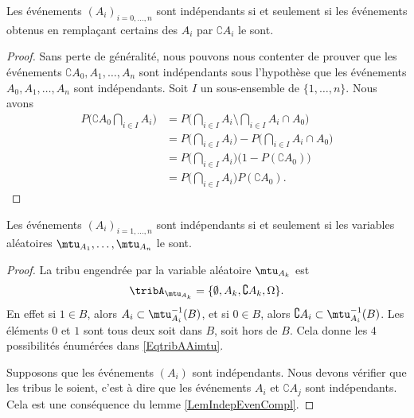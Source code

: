 \begin{lemma}       \label{LemIndepEvenCompl}
    Les événements \( (A_i)_{i=0,\ldots,n}\) sont indépendants si et seulement si les événements obtenus en remplaçant certains des \( A_i\) par \( \complement A_i\) le sont.
\end{lemma}

\begin{proof}
    Sans perte de généralité, nous pouvons nous contenter de prouver que les événements \( \complement A_0,A_1,\ldots,A_n\) sont indépendants sous l'hypothèse que les événements \( A_0,A_1,\ldots,A_n\) sont indépendants. Soit \( I\) un sous-ensemble de \( \{ 1,\ldots,n \}\). Nous avons
    \begin{subequations}
        \begin{align}
            P\big( \complement A_0\bigcap_{i\in I}A_i \big)&=P\big( \bigcap_{i\in I}A_i\setminus\bigcap_{i\in I}A_i\cap A_0 \big)\\
            &=P\big( \bigcap_{i\in I}A_i \big)-P\big( \bigcap_{i\in I}A_i\cap A_0 \big)\\
            &=P\big( \bigcap_{i\in I}A_i \big)\big( 1-P(\complement A_0) \big)\\
            &=P\big( \bigcap_{i\in I}A_i \big)P(\complement A_0).
        \end{align}
    \end{subequations}
\end{proof}

\begin{proposition}
    Les événements \( (A_i)_{i=1,\ldots,n}\) sont indépendants si et seulement si les variables aléatoires \( \mtu_{A_1},\ldots,\mtu_{A_n}\) le sont.
\end{proposition}

\begin{proof}
    La tribu engendrée par la variable aléatoire \( \mtu_{A_k}\) est
    \begin{equation}    \label{EqtribAAimtu}
        \tribA_{\mtu_{A_k}}=\{ \emptyset,A_k,\complement A_k,\Omega \}.
    \end{equation}
    En effet si \( 1\in B\), alors \( A_i\subset\mtu_{A_i}^{-1}(B)\), et si \( 0\in B\), alors \( \complement A_i\subset\mtu_{A_i}^{-1}(B)\). Les éléments \( 0\) et \( 1\) sont tous deux soit dans \( B\), soit hors de \( B\). Cela donne les \( 4\) possibilités énumérées dans \eqref{EqtribAAimtu}.

    Supposons que les événements \( (A_i)\) sont indépendants. Nous devons vérifier que les tribus le soient, c'est à dire que les événements \( A_i\) et \( \complement A_j\) sont indépendants. Cela est une conséquence du lemme \ref{LemIndepEvenCompl}.
\end{proof}

